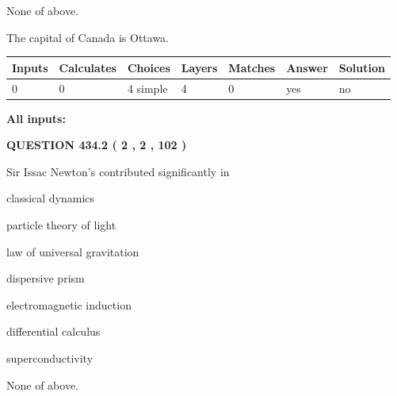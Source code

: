 \documentclass[12pt]{article}
\begin{document}
 
 None of above.
 
 
\noindent{}
 
 
The capital of Canada is Ottawa.
 
 
\noindent{}
 
 
   
   
   
   
\noindent\begin{tabular}{|l|l|l|l|l|l|l|}
 \hline
Inputs & Calculates & Choices & Layers & Matches & Answer & Solution \\ \hline
 0  & 
 0  & 
 4
  simple  
  & 
 4  & 
 0  & 
  yes & 
  no 
  \\ \hline
 \end{tabular}
   
   
   
   
\noindent{}
   
   
   
   
\noindent\vspace{0.1in}\hspace{-0.08in} {\textbf{\Large{All inputs: }}}
   
   
  
\vspace{0.2in}
  
{\textbf{\Large{QUESTION
434.2 
 ( 2 , 2 , 102 )
}}}
  
  
Sir Issac Newton's contributed significantly in
 
 
classical dynamics
 
 
particle theory of light
 
 
law of universal gravitation
 
 
dispersive prism
 
 
electromagnetic induction
 
 
differential calculus
 
 
superconductivity
 
 
 None of above.
 
\end{document}
